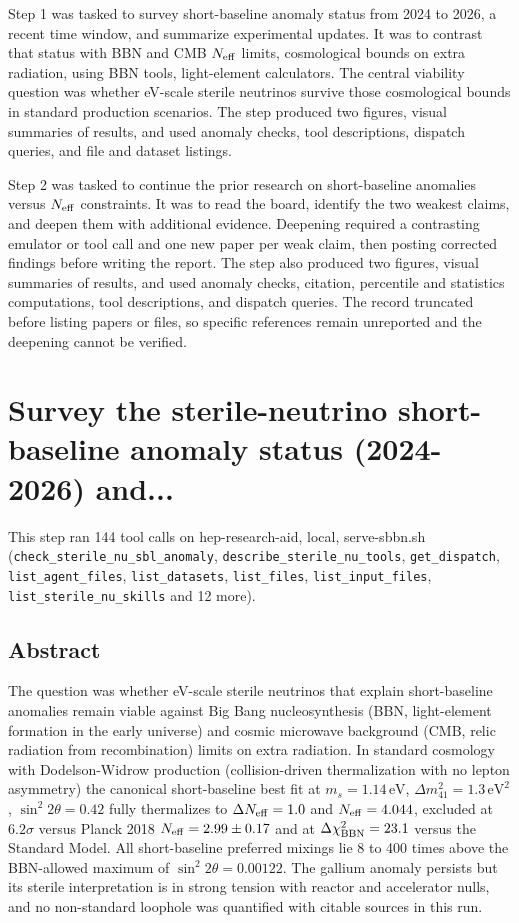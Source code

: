 \documentclass[11pt,a4paper]{article}
\begin{document}
Step 1 was tasked to survey short-baseline anomaly status from 2024 to 2026, a recent time window, and summarize experimental updates. It was to contrast that status with BBN and CMB $N_{\rm eff}$ limits, cosmological bounds on extra radiation, using BBN tools, light-element calculators. The central viability question was whether eV-scale sterile neutrinos survive those cosmological bounds in standard production scenarios. The step produced two figures, visual summaries of results, and used anomaly checks, tool descriptions, dispatch queries, and file and dataset listings.

Step 2 was tasked to continue the prior research on short-baseline anomalies versus $N_{\rm eff}$ constraints. It was to read the board, identify the two weakest claims, and deepen them with additional evidence. Deepening required a contrasting emulator or tool call and one new paper per weak claim, then posting corrected findings before writing the report. The step also produced two figures, visual summaries of results, and used anomaly checks, citation, percentile and statistics computations, tool descriptions, and dispatch queries. The record truncated before listing papers or files, so specific references remain unreported and the deepening cannot be verified.

\section{Survey the sterile-neutrino short-baseline anomaly status (2024-2026) and...}
This step ran 144 tool calls on hep-research-aid, local, serve-sbbn.sh (\texttt{check\_sterile\_nu\_sbl\_anomaly}, \texttt{describe\_sterile\_nu\_tools}, \texttt{get\_dispatch}, \texttt{list\_agent\_files}, \texttt{list\_datasets}, \texttt{list\_files}, \texttt{list\_input\_files}, \texttt{list\_sterile\_nu\_skills} and 12 more).\par
\subsection{Abstract}
The question was whether eV-scale sterile neutrinos that explain short-baseline anomalies remain viable against Big Bang nucleosynthesis (BBN, light-element formation in the early universe) and cosmic microwave background (CMB, relic radiation from recombination) limits on extra radiation. In standard cosmology with Dodelson-Widrow production (collision-driven thermalization with no lepton asymmetry) the canonical short-baseline best fit at $m_s = 1.14\,\mathrm{eV}$, $\Delta m^2_{41} = 1.3\,\mathrm{eV}^2$, $\sin^2 2\theta = 0.42$ fully thermalizes to $\Delta N_{\rm eff} = 1.0$ and $N_{\rm eff} = 4.044$, excluded at $6.2\sigma$ versus Planck 2018 $N_{\rm eff} = 2.99 \pm 0.17$ and at $\Delta\chi^2_{\rm BBN} = 23.1$ versus the Standard Model. All short-baseline preferred mixings lie 8 to 400 times above the BBN-allowed maximum of $\sin^2 2\theta = 0.00122$. The gallium anomaly persists but its sterile interpretation is in strong tension with reactor and accelerator nulls, and no non-standard loophole was quantified with citable sources in this run.
\end{document}
